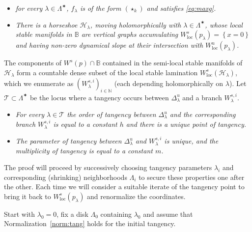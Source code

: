 \documentclass[11pt, oneside]{amsart}
\newcommand{\B}{\mathbb{B}}
\newcommand{\N}{\mathbb{N}}
\newcommand{\set}[1]{\left\{#1\right\}}
\newcommand{\la}{\lambda}
\newcommand{\loc}{{\mathrm{loc}}}
\theoremstyle{remark}
\theoremstyle{definition}
\theoremstyle{theorem}
\begin{document}
\begin{itemize}
\item [(P1)] \textit{for every $\lambda\in \Lambda^\varstar$, $f_\la$ is of the form $(\star_k)$ and satisfies \eqref{eq:maxg}.}
\item [(P2)]  \textit{There is a horseshoe $\mathcal H_\lambda$, moving holomorphically with $\lambda\in \Lambda^\varstar$, whose local stable manifolds in $\B$ are vertical graphs 
accumulating $W^s_\loc(p_\lambda) = \set{x=0}$ and having non-zero dynamical slope at their intersection with  $W^u_\loc(p_\lambda)$.}
\end{itemize}

The  components of  $W^s(p)\cap \B$ contained in the semi-local stable manifolds of 
 $\mathcal H_\lambda$  form a countable dense subset of the local stable lamination 
 $W^s_\loc(\mathcal H_\lambda)$, which we enumerate as $(W^{s,i}_\lambda)_{i\in \N}$ 
 (each depending holomorphically on $\lambda$). 
% 
% 
 Let $\mathcal T\subset\Lambda^\varstar$ be the   locus where a tangency occurs 
between $\Delta^u_\lambda$ and a branch
 $W^{s,i}_\lambda$.
\begin{itemize}
 \item[(P3)] \textit{For every $\lambda \in \mathcal T$ the   order of tangency between
  $\Delta^u_\lambda$ and the corresponding  branch
 $W^{s,i}_\lambda$
 is equal to a constant $h$ and there is a unique point of tangency.}
 \item[(P4)] \textit{The parameter of tangency between $\Delta^u_\lambda$ and  
 $W^{s,i}_\lambda$ is unique, and the multiplicity of tangency is equal to a constant $m$. }
\end{itemize}
 
 The proof will proceed by   successively choosing 
    tangency parameters $\lambda_i$ and corresponding (shrinking) neighborhoods
   $\Lambda_i$ to secure these properties one after the other. Each 
  time we will consider a suitable iterate of the tangency point to bring it back to 
  $W^s_\loc(p_\lambda)$ and  renormalize the coordinates. 

Start with $\lambda_0 = 0$, fix a disk $\Lambda_0$ containing $\lambda_0$
 and assume that Normalization~\ref{norm:tang} 
holds for the initial tangency. 
\end{document}
